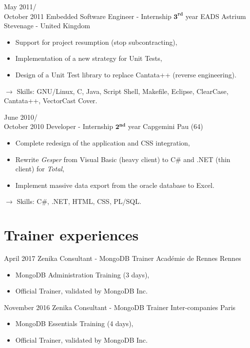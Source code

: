 \documentclass[11pt,a4paper]{moderncv}
\begin{document}
\cventry
{May 2011/\\October 2011}
{Embedded Software Engineer - Internship $\mathbf{3^{rd}}$ year}
{EADS Astrium}
{Stevenage - United Kingdom}
{}
{\begin{itemize}
\item Support for project resumption (stop subcontracting),
\item Implementation of a new strategy for Unit Tests,
\item Design of a Unit Test library to replace Cantata++ (reverse engineering).
\end{itemize}
$\rightarrow$ Skills: GNU/Linux, C, Java, Script Shell, Makefile, Eclipse, ClearCase, Cantata++, VectorCast Cover.
}   %

\cventry
{June 2010/\\October 2010}
{Developer - Internship $\mathbf{2^{nd}}$ year}
{Capgemini}
{Pau (64)}
{}
{\begin{itemize}
\item Complete redesign of the application and CSS integration,
\item Rewrite \emph{Gesper} from Visual Basic (heavy client) to C\# and .NET (thin client) for \emph{Total},
\item Implement massive data export from the oracle database to Excel.
\end{itemize}
$\rightarrow$ Skills: C\#, .NET, HTML, CSS, PL/SQL.
}   %


\section{Trainer experiences}

\cventry
{April 2017}
{Zenika Consultant - MongoDB Trainer}
{Académie de Rennes}
{Rennes}
{}
{\begin{itemize}
\item MongoDB Administration Training (3 days),
\item Official Trainer, validated by MongoDB Inc.
\end{itemize}
}   %

\cventry
{November 2016}
{Zenika Consultant - MongoDB Trainer}
{Inter-companies}
{Paris}
{}
{\begin{itemize}
\item MongoDB Essentials Training (4 days),
\item Official Trainer, validated by MongoDB Inc.
\end{itemize}
}   %
\end{document}
